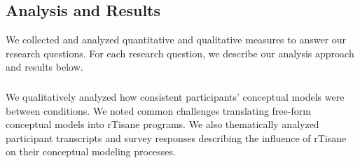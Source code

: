 
\subsection{Analysis and Results}
We collected and analyzed quantitative and qualitative measures to answer our
research questions. For each research question, we describe our analysis
approach and results below. 


\subsubsection{\evalConceptualModels}
We qualitatively analyzed how consistent participants' conceptual models were
between conditions. We noted common challenges translating free-form conceptual
models into rTisane programs. We also thematically analyzed participant
transcripts and survey responses describing the influence of rTisane on their
conceptual modeling processes. 


